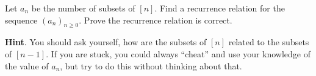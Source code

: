 \documentclass{book}
\begin{document}
\setcounter{cpjt}{134}
\addtocounter{cpjt}{-1}
\begin{activity}\label{activity-127}
\hypertarget{p-892}{}%
Let \(a_n\) be the number of subsets of \([n]\).  Find a recurrence relation for the sequence \((a_n)_{n \ge 0}\).  Prove the recurrence relation is correct.%
\par\smallskip%
\noindent\textbf{Hint}.\hypertarget{hint-92}{}\quad%
\hypertarget{p-893}{}%
You should ask yourself, how are the subsets of \([n]\) related to the subsets of \([n-1]\).  If you are stuck, you could always ``cheat'' and use your knowledge of the value of \(a_n\), but try to do this without thinking about that.%
\end{activity}

\clearpage
\end{document}
